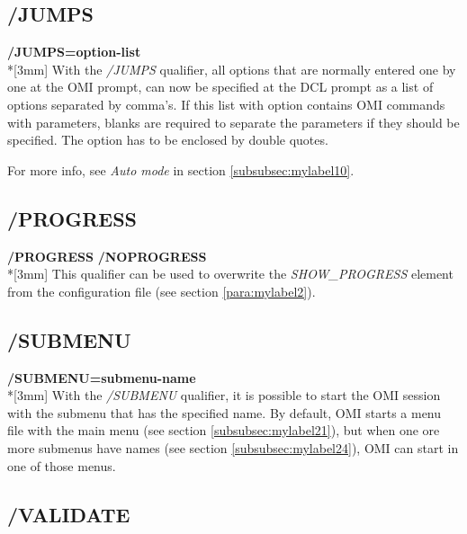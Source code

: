 \documentclass[a4paper]{book}
\newcommand{\vs}{\vspace{3mm}}
\renewcommand{\indent}{\hspace*{5mm}}
\begin{document}
\subsection{/JUMPS}
\label{subsubsec:mylabel5}

\vs

\indent\textbf{/JUMPS=option-list}\\*[3mm]
With the \textsl{/JUMPS} qualifier, all options that are normally entered one by one 
at the OMI prompt, can now be specified at the DCL prompt as a list of 
options separated by comma's. If this list with option contains OMI commands 
with parameters, blanks are required to separate the parameters if they 
should be specified. The option has to be enclosed by double quotes.

\vs

For more info, see \textit{Auto mode} in section \ref{subsubsec:mylabel10}.

\subsection{/PROGRESS}
\label{subsubsec:mylabel6}

\vs

\indent\textbf{/PROGRESS} \newline
\indent\textbf{/NOPROGRESS}\\*[3mm]
This qualifier can be used to overwrite the \textsl{SHOW{\_}PROGRESS} element from 
the configuration file (see section \ref{para:mylabel2}).

\subsection{/SUBMENU}
\label{subsubsec:mylabel7}

\vs

\indent\textbf{/SUBMENU=submenu-name}\\*[3mm]
With the \textsl{/SUBMENU} qualifier, it is possible to start the OMI session with 
the submenu that has the specified name. By default, OMI starts a menu file 
with the main menu (see section \ref{subsubsec:mylabel21}), but when 
one ore more submenus have names (see section \ref{subsubsec:mylabel24}),
OMI can start in one of those menus.

\subsection{/VALIDATE}
\label{subsubsec:mylabel8}
\end{document}
